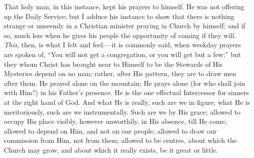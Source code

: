 That holy man, in this instance, kept his prayers to himself. He
was not offering up the Daily Service; but I adduce his instance to
show that there is nothing strange or unseemly in a Christian minister
praying in Church by himself; and if so, much less when he gives his
people the opportunity of coming if they will. \emph{This}, then, is
what I felt and feel:—it is commonly said, when weekday prayers are
spoken of, ``You will not get a congregation, or you will get but
a few;'' but they whom Christ has brought near to Himself to be
the Stewards of His Mysteries depend on no man; rather, after His
pattern, they are to draw men after them. He prayed alone on the
mountain; He prays alone (for who shall join with Him?) in his Father's
presence. He is the one effectual Intercessor for sinners at the right
hand of God. And what He is really, such are we in figure; what He is
meritoriously, such are we instrumentally. Such are we by His grace;
allowed to occupy His place visibly, however unworthily, in His
absence, till He come; allowed to depend on Him, and not on our
people; allowed to draw our commission from Him, not from them;
allowed to be centres, about which the Church may grow, and about
which it really exists, be it great or little.

